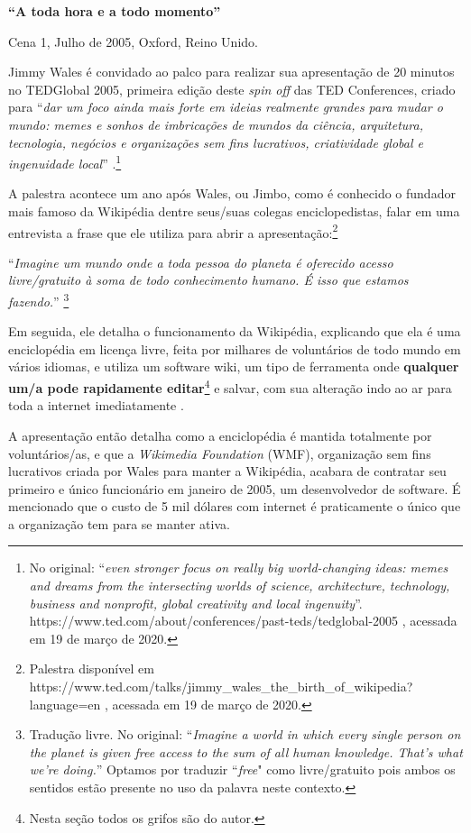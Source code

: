 \textbf{``A toda hora e a todo momento''}

Cena 1, Julho de 2005, Oxford, Reino Unido.

Jimmy Wales é convidado ao palco para realizar sua apresentação de 20 minutos no TEDGlobal 2005, primeira edição deste \textit{spin off} das TED Conferences, criado para ``\textit{dar um foco ainda mais forte em ideias realmente grandes para mudar o mundo: memes e sonhos de imbricações de mundos da ciência, arquitetura, tecnologia, negócios e organizações sem fins lucrativos, criatividade global e ingenuidade local}'' \citep{ted_global_2005}.\footnote{No original: ``\textit{even stronger focus on really big world-changing ideas: memes and dreams from the intersecting worlds of science, architecture, technology, business and nonprofit, global creativity and local ingenuity}''.  https://www.ted.com/about/conferences/past-teds/tedglobal-2005 , acessada em 19 de março de 2020.}

A palestra acontece um ano após Wales, ou Jimbo, como é conhecido o fundador mais famoso da Wikipédia dentre seus/suas colegas enciclopedistas, falar em uma entrevista a frase que ele utiliza para abrir a apresentação:\footnote{Palestra disponível em https://www.ted.com/talks/jimmy\_wales\_the\_birth\_of\_wikipedia?language=en , acessada em 19 de março de 2020.}

``\textit{Imagine um mundo onde a toda pessoa do planeta é oferecido acesso livre/gratuito à soma de todo conhecimento humano. É isso que estamos fazendo.}'' \citep{wales_interview_2004}\footnote{Tradução livre. No original: ``\textit{Imagine a world in which every single person on the planet is given free access to the sum of all human knowledge. That's what we're doing.}'' Optamos por traduzir ``\textit{free}" como livre/gratuito pois ambos os sentidos estão presente no uso da palavra neste contexto. }

Em seguida, ele detalha o funcionamento da Wikipédia, explicando que ela é uma enciclopédia em licença livre, feita por milhares de voluntários de todo mundo em vários idiomas, e utiliza um software wiki, um tipo de ferramenta onde \textbf{qualquer um/a pode rapidamente editar}\footnote{ Nesta seção todos os grifos são do autor.} e salvar, com sua alteração indo ao ar para toda a internet imediatamente \citep{wales_birth_2005}.

A apresentação então detalha como a enciclopédia é mantida totalmente por voluntários/as, e que a \textit{Wikimedia Foundation} (WMF), organização sem fins lucrativos criada por Wales para manter a Wikipédia, acabara de contratar seu primeiro e único funcionário em janeiro de 2005, um desenvolvedor de software. É mencionado que o custo de 5 mil dólares com internet é praticamente o único que a organização tem para se manter ativa.

